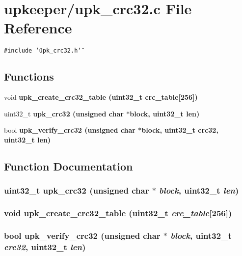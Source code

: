 \section{upkeeper/upk\_\-crc32.c File Reference}
\label{upk__crc32_8c}
{\tt \#include \char`\"{}upk\_\-crc32.h\char`\"{}}\par
\subsection*{Functions}
\begin{CompactItemize}
\item 
void \bf{upk\_\-create\_\-crc32\_\-table} (uint32\_\-t crc\_\-table[256])
\item 
uint32\_\-t \bf{upk\_\-crc32} (unsigned char $\ast$block, uint32\_\-t len)
\item 
bool \bf{upk\_\-verify\_\-crc32} (unsigned char $\ast$block, uint32\_\-t crc32, uint32\_\-t len)
\end{CompactItemize}


\subsection{Function Documentation}
\subsubsection{\setlength{\rightskip}{0pt plus 5cm}uint32\_\-t upk\_\-crc32 (unsigned char $\ast$ {\em block}, uint32\_\-t {\em len})}\label{upk__crc32_8c_9f317e8418a0af4b71851819bf8ce01c}


\subsubsection{\setlength{\rightskip}{0pt plus 5cm}void upk\_\-create\_\-crc32\_\-table (uint32\_\-t {\em crc\_\-table}[256])}\label{upk__crc32_8c_2b6933bfdf4caa303dbdb7626417e01a}


\subsubsection{\setlength{\rightskip}{0pt plus 5cm}bool upk\_\-verify\_\-crc32 (unsigned char $\ast$ {\em block}, uint32\_\-t {\em crc32}, uint32\_\-t {\em len})}\label{upk__crc32_8c_135c3c60ebe008d88d6812b51a42e57f}


